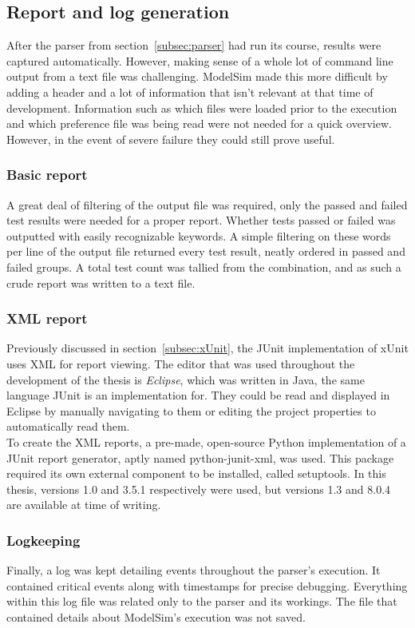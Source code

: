 \documentclass[11pt,british]{article}
\begin{document}
\subsection{Report and log generation}
\label{subsec:reports}
After the parser from section~\ref{subsec:parser} had run its course, results were captured automatically. However, making sense of a whole lot of command line output from a text file was challenging. ModelSim made this more difficult by adding a header and a lot of information that isn't relevant at that time of development. Information such as which files were loaded prior to the execution and which preference file was being read were not needed for a quick overview. However, in the event of severe failure they could still prove useful.

\subsubsection{Basic report}
A great deal of filtering of the output file was required, only the passed and failed test results were needed for a proper report. Whether tests passed or failed was outputted with easily recognizable keywords. A simple filtering on these words per line of the output file returned every test result, neatly ordered in passed and failed groups. A total test count was tallied from the combination, and as such a crude report was written to a text file.

\subsubsection{XML report}
Previously discussed in section~\ref{subsec:xUnit}, the JUnit implementation of xUnit uses \gls{XML} for report viewing. The editor that was used throughout the development of the thesis is \emph{Eclipse}, which was written in Java, the same language JUnit is an implementation for. They could be read and displayed in Eclipse by manually navigating to them or editing the project properties to automatically read them.
\\[\baselineskip]
To create the XML reports, a pre-made, open-source Python implementation of a JUnit report generator, aptly named python-junit-xml, was used. This package required its own external component to be installed, called setuptools.\cite{junitxml, setuptools} In this thesis, versions 1.0 and 3.5.1 respectively were used, but versions 1.3 and 8.0.4 are available at time of writing. 

\subsubsection{Logkeeping}
Finally, a log was kept detailing events throughout the parser's execution. It contained critical events along with timestamps for precise debugging. Everything within this log file was related only to the parser and its workings. The file that contained details about ModelSim's execution was not saved.
\end{document}
